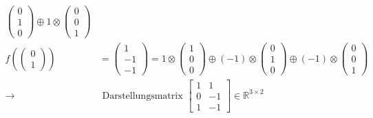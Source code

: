 \documentclass[a5paper, 10pt]{book}
\newcommand{\circleplus}{\oplus}%
\newcommand{\circlecdot}{\otimes}%
\begin{document}
\begin{itemize}
\begin{align}
\begin{pmatrix}
								0 \\ 1 \\ 0
							\end{pmatrix} \circleplus 1 \circlecdot \begin{pmatrix}
								0 \\ 0 \\ 1
							\end{pmatrix}\\
							f\left( \begin{pmatrix}
							0 \\ 1
							\end{pmatrix}  \right) &= \begin{pmatrix}
							1 \\ -1 \\ -1
							\end{pmatrix} = 1 \circlecdot \begin{pmatrix}
							1 \\ 0 \\ 0
							\end{pmatrix} \circleplus (-1) \circlecdot \begin{pmatrix}
							0 \\ 1 \\ 0
							\end{pmatrix} \circleplus (-1) \circlecdot \begin{pmatrix}
							0 \\ 0 \\ 1
							\end{pmatrix}\\
							\rightarrow& \text{ Darstellungsmatrix }\begin{bmatrix}
							1	& 1 \\
							0	& -1 \\
							1	& -1
							\end{bmatrix} \in \mathbb{R}^{3 \times 2}
						\end{align}
						

\end{itemize}
\end{document}

